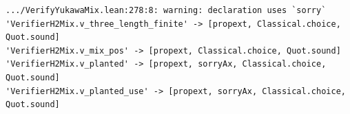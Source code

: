 \begin{Verbatim}[fontsize=\scriptsize,frame=single,framesep=1.5mm]
.../VerifyYukawaMix.lean:278:8: warning: declaration uses `sorry`
'VerifierH2Mix.v_three_length_finite' -> [propext, Classical.choice, Quot.sound]
'VerifierH2Mix.v_mix_pos' -> [propext, Classical.choice, Quot.sound]
'VerifierH2Mix.v_planted' -> [propext, sorryAx, Classical.choice, Quot.sound]
'VerifierH2Mix.v_planted_use' -> [propext, sorryAx, Classical.choice, Quot.sound]
\end{Verbatim}
